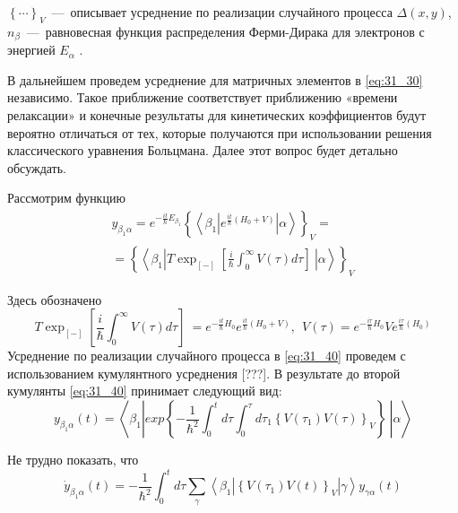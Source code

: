 \noindent ${\left\{\cdots \right\}}_V$~---~описывает усреднение по реализации случайного процесса $\Delta \left(x,y\right)$, $n_{\beta }$~---~равновесная функция распределения Ферми-Дирака для электронов с энергией $E_{\alpha }$ .

В дальнейшем проведем усреднение для матричных элементов в \eqref{eq:31_30} независимо. Такое приближение соответствует приближению «времени релаксации» \cite{Khamidullin2002} и конечные результаты для кинетических коэффициентов будут вероятно отличаться от тех, которые получаются при использовании решения классического уравнения Больцмана. Далее этот вопрос будет детально обсуждать.

\noindent Рассмотрим функцию
\begin{multline} \label{eq:31_40}
y_{{\beta }_1\alpha }=e^{-\frac{it}{\hbar }E_{{\beta }_1}}{\left\{\left\langle {\beta }_1\left|e^{\frac{it}{\hbar }\left(H_0+V\right)}\right|\alpha \right\rangle \right\}}_V=\\
={\left\{\left\langle {\beta }_1\left|T{{\exp}_{[-]} \left[\frac{i}{\hbar }\int^{\infty }_0{V\left(\tau \right)d \tau }\right]\ }\right|\alpha \right\rangle \right\}}_V
\end{multline}

\noindent Здесь обозначено
\[
T{{\exp}_{\left[-\right]} \left[\frac{i}{\hbar }\int^{\infty }_0{V\left(\tau \right)d \tau }\right]\ }=e^{-\frac{it}{\hbar }H_0}e^{\frac{it}{\hbar }\left(H_0+V\right)},\ \ V\left(\tau \right)=e^{-\frac{i\tau }{\hbar }H_0}Ve^{\frac{i\tau }{\hbar }\left(H_0\right)}
\] 
{\color{red}Усреднение по реализации случайного процесса в \eqref{eq:31_40} проведем с использованием кумулянтного усреднения [???].} В результате до второй кумулянты \eqref{eq:31_40} принимает следующий вид:
\begin{equation} \label{eq:31_50}
y_{{\beta }_1\alpha }\left(t\right)=\left\langle {\beta }_1\left|{exp \left\{-\frac{1}{{\hbar }^2}\int^t_0{d \tau \int^{\tau }_0{d {\tau }_1{\left\{V\left({\tau }_1\right)V\left(\tau \right)\right\}}_V}}\right\}\ }\right|\alpha \right\rangle
\end{equation} 

\noindent Не трудно показать, что
\begin{equation} \label{eq:31_60}
{\dot{y}}_{{\beta }_1\alpha }\left(t\right)=-\frac{1}{{\hbar }^2}\int^t_0{d \tau \sum_{\gamma }{\left\langle {\beta }_1\left|{\left\{V\left({\tau }_1\right)V\left(t\right)\right\}}_V\right|\gamma \right\rangle y_{\gamma \alpha }\left(t\right)}}
\end{equation} 

